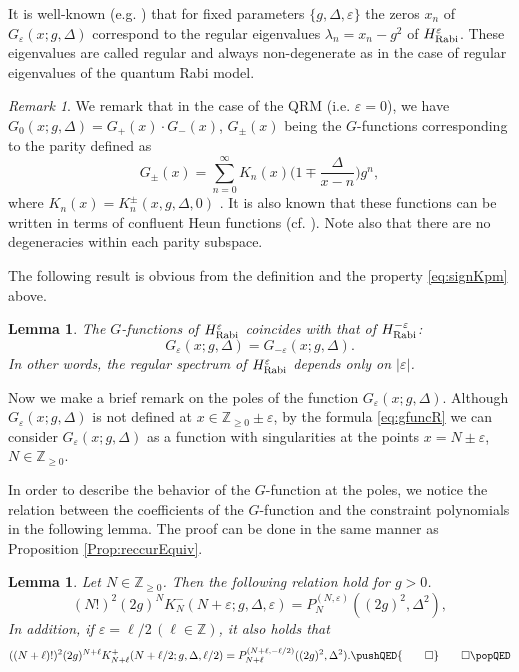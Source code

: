 \documentclass[11pt]{article}
\numberwithin{equation}{section}
\newcommand{\Z}{\mathbb{Z}} %
\newcommand{\e}{\varepsilon}
\newcommand{\HRabi}[1]{H_{\text{\upshape Rabi}}^{#1}} %
\newcommand{\cp}[2]{P^{(#1)}_{#2}} %
\newcommand{\QEDhere}{\pushQED{\qed}\qedhere\popQED}
\theoremstyle{plain}
\newtheorem{lem}[thm]{Lemma}
\theoremstyle{definition}
\theoremstyle{remark}
\newtheorem{rem}{Remark}[section]
\begin{document}
It is well-known (e.g. \cite{B2011PRL,B2013AP,Le2016}) that for fixed parameters \(\{g,\Delta,\e\}\) the zeros \(x_n\) of \( G_\e(x;g,\Delta)\) correspond to the regular eigenvalues \(\lambda_n = x_n-g^2\) of \(\HRabi{\e}\). These eigenvalues are called regular and always non-degenerate as in the case of regular eigenvalues of the quantum Rabi model.

\begin{rem}\label{rem:Parity}
  We remark that in the case of the QRM (i.e. $\e=0$), we have $G_0(x;g,\Delta)= G_+(x)\cdot G_-(x)$,  $G_\pm(x)$ being the $G$-functions
  corresponding to the parity defined as
  \[
    G_\pm(x)=\sum_{n=0}^\infty K_n(x)\Big(1\mp \frac{\Delta}{x-n}\Big)g^n,
  \]
  where $ K_n(x)= K_n^\pm(x,g,\Delta, 0)$ \cite{B2011PRL}.
  It is also known that these functions can be written in terms of confluent Heun functions (cf. \cite{B2013MfI}).
  Note also that there are no degeneracies within each parity subspace.
\end{rem}

The following result is obvious from the definition and the property \eqref{eq:signKpm} above.

\begin{lem}\label{G-function}
  The $G$-functions of \(\HRabi{\e}\) coincides with that of \(\HRabi{-\e}\):
  \begin{equation}
    \label{eq:gfunctrel}
    G_\e(x;g,\Delta)  = G_{-\e}(x;g,\Delta).
  \end{equation}
  In other words, the regular spectrum of \(\HRabi{\e}\) depends only on \(|\e|\). \QEDhere
\end{lem}

Now we make a brief remark on the poles of the function $G_\e(x;g,\Delta)$.
Although  $G_\e(x;g,\Delta)$ is not defined at \(x\in\Z_{\geq0}\pm\e\),
by the formula \eqref{eq:gfuncR} we can consider \(G_\e(x;g,\Delta)\) as a function with
singularities at the points \(x= N \pm \e\), \(N \in \Z_{\geq 0} \).

In order to describe the behavior of the $G$-function at the poles,
we notice the relation between the coefficients of the $G$-function
and the constraint polynomials in the following lemma.
The proof can be done in the same manner as Proposition \ref{Prop:reccurEquiv}.

\begin{lem} \label{lem:GcoeffcPoly}
  Let \(N \in \Z_{\geq 0}\). Then the following relation hold for $g>0$.
  \begin{equation}
    \label{eq:coeffGfunct}
         (N!)^2 (2g)^{N} K^{-}_N(N+\e;g,\Delta,\e) = \cp{N,\e}{N}((2g)^2,\Delta^2),
  \end{equation}
  In addition, if \(\e = \ell/2 \, (\ell \in \Z)\), it also holds that
\begin{equation*}
((N+\ell)!)^2 (2g)^{N+\ell} K^{+}_{N+\ell}(N+\ell/2;g,\Delta,\ell/2) = \cp{N+\ell,-\ell/2}{N+\ell}((2g)^2,\Delta^2). \QEDhere
\end{equation*}
\end{lem}
\end{document}
